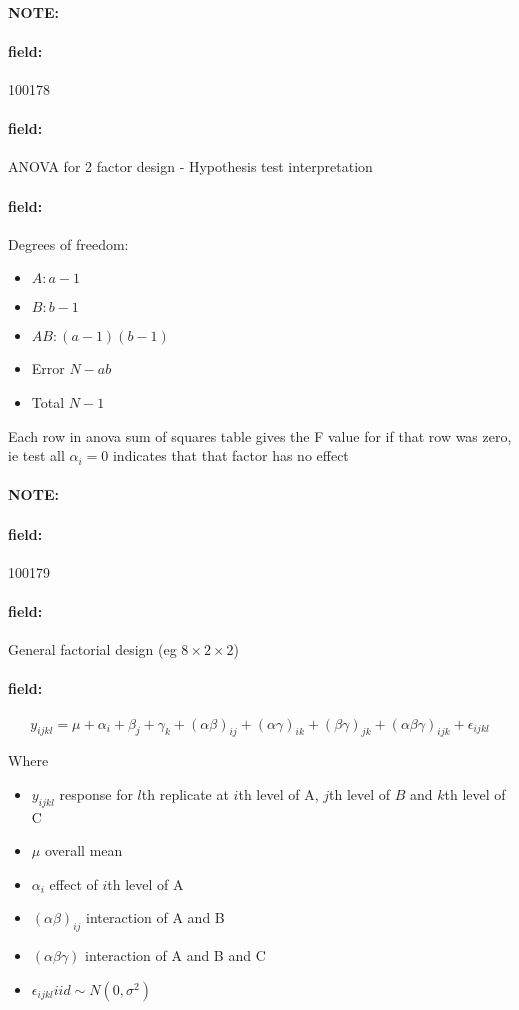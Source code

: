 \documentclass[12pt]{article}
\newenvironment{note}{\paragraph{NOTE:}}{}
\newenvironment{field}{\paragraph{field:}}{}
\begin{document}
\begin{note}
    \begin{field}
        \tiny 100178
    \end{field}
    \begin{field}
        ANOVA for 2 factor design - Hypothesis test interpretation
    \end{field}
    \begin{field}
      Degrees of freedom:
        \begin{itemize}
          \item $A: a - 1$
          \item $B: b-1$
          \item $AB: (a-1)(b-1)$
          \item Error $N - ab$
          \item Total $N-1$
        \end{itemize}
        Each row in anova sum of squares table gives the F value for if that row was zero, ie test all $\alpha_i = 0$ indicates that that factor has no effect
    \end{field}
\end{note}

\begin{note}
    \begin{field}
        \tiny 100179
    \end{field}
    \begin{field}
        General factorial design (eg $8 \times 2 \times 2$)
    \end{field}
    \begin{field}
        $$ y_{ijkl} = \mu + \alpha_i + \beta_j + \gamma_k + (\alpha\beta)_{ij} + (\alpha\gamma)_{ik} + (\beta\gamma)_{jk} + (\alpha\beta\gamma)_{ijk} + \epsilon_{ijkl} $$


        Where
        \begin{itemize}
          \item $y_{ijkl}$ response for $l$th replicate at $i$th level of A, $j$th level of $B$ and $k$th level of C
          \item $\mu$ overall mean
          \item $\alpha_i$ effect of $i$th level of A
          \item $(\alpha\beta)_{ij}$ interaction of A and B
          \item $(\alpha\beta\gamma)$ interaction of A and B and C
          \item $\epsilon_{ijkl} iid \sim N(0,\sigma^2)$
        \end{itemize}
    \end{field}
\end{note}
\end{document}
